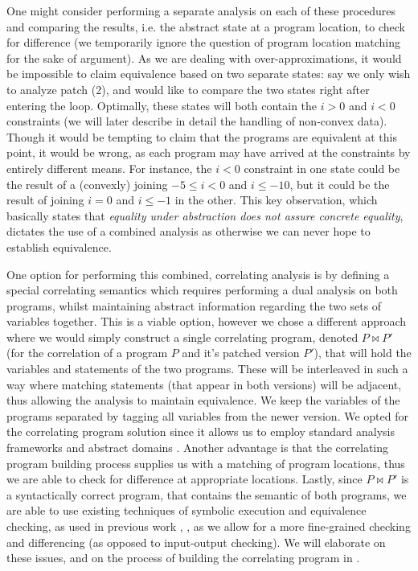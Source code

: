 One might consider performing a separate analysis on each of these procedures and comparing the results, i.e. the abstract state at a program location, to check for difference (we temporarily ignore the question of program location matching for the sake of argument). As we are dealing with over-approximations, it would be impossible to claim equivalence based on two separate states: say we only wish to analyze patch (2), and would like to compare the two states right after entering the loop. Optimally, these states will both contain the ${i > 0}$ and ${i < 0}$ constraints (we will later describe in detail the handling of non-convex data). Though it would be tempting to claim that the programs are equivalent at this point, it would be wrong, as each program may have arrived at the constraints by entirely different means. For instance, the ${i < 0}$ constraint in one state could be the result of a (convexly) joining ${-5 \leq i < 0}$ and ${i \leq -10}$, but it could be the result of joining ${i = 0}$ and ${i \leq -1}$ in the other. This key observation, which basically states that \emph{equality under abstraction does not assure concrete equality}, dictates the use of a combined analysis as otherwise we can never hope to establish equivalence.

One option for performing this combined, correlating analysis is by defining a special correlating semantics which requires performing a dual analysis on both programs, whilst maintaining abstract information regarding the two sets of variables together. This is a viable option, however we chose a different approach where we would simply construct a single correlating program, denoted $P \bowtie P'$ (for the correlation of a program $P$ and it's patched version $P'$), that will hold the variables and statements of the two programs. These will be interleaved in such a way where matching statements (that appear in both versions) will be adjacent, thus allowing the analysis to maintain equivalence. We keep the variables of the programs separated by tagging all variables from the newer version. We opted for the correlating program solution since it allows us to employ standard analysis frameworks \cite{CLang} and abstract domains \cite{JeannetMine09}. Another advantage is that the correlating program building process supplies us with a matching of program locations, thus we are able to check for difference at appropriate locations. Lastly, since $P \bowtie P'$ is a syntactically correct program, that contains the semantic of both programs, we are able to use existing techniques of symbolic execution and equivalence checking, as used in previous work \cite{GodlinStrichman09,DwyerElbaumPerson08,EnglerRamos11}, , as we allow for a more fine-grained checking and differencing (as opposed to input-output checking). We will elaborate on these issues, and on the process of building the correlating program in .

